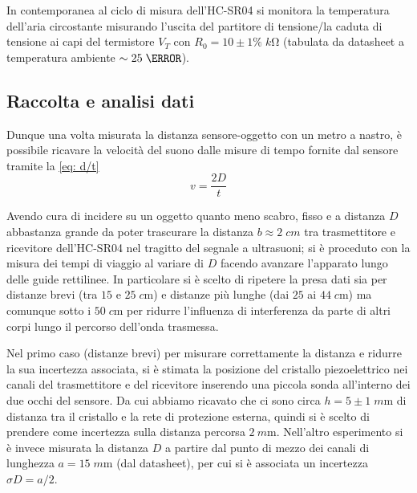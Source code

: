 \documentclass[10pt, a4paper, italian]{article}
\begin{document}
In contemporanea al ciclo di misura dell'HC-SR04 si monitora la temperatura
dell'aria circostante misurando l'uscita del partitore di tensione/la caduta
di tensione ai capi del termistore $V_T$ con $R_0 = 10 \pm 1 \percent \;
\si{k\ohm}$ (tabulata da datasheet a temperatura ambiente $\sim 25 \;
\degreeCelsius$).

\subsection{Raccolta e analisi dati}\label{sbs: data}
Dunque una volta misurata la distanza sensore-oggetto con un metro a nastro,
è possibile ricavare la velocità del suono dalle misure di tempo fornite dal
sensore tramite la \cref{eq: d/t}
\begin{equation}\label{eq: d/t}
v = \frac{2 D}{t}
\end{equation}

Avendo cura di incidere su un oggetto quanto meno scabro, fisso e a distanza
$D$ abbastanza grande da poter trascurare la distanza $b \approx 2 \; \si{cm}$
tra trasmettitore e ricevitore dell'HC-SR04 nel tragitto del segnale a
ultrasuoni; si è proceduto con la misura dei tempi di viaggio al variare di
$D$ facendo avanzare l'apparato lungo delle guide rettilinee. In particolare
si è scelto di ripetere la presa dati sia per distanze brevi (tra $15$ e
$25 \; \si{c\m}$) e distanze più lunghe (dai $25$ ai $44 \; \si{c\m}$) ma
comunque sotto i $50 \; \si{c\m}$ per ridurre l'influenza di interferenza da
parte di altri corpi lungo il percorso dell'onda trasmessa.

Nel primo caso (distanze brevi) per misurare correttamente la distanza e
ridurre la sua incertezza associata, si è stimata la posizione del cristallo
piezoelettrico nei canali del trasmettitore e del ricevitore inserendo una
piccola sonda all'interno dei due occhi del sensore. Da cui abbiamo ricavato
che ci sono circa $h = 5 \pm 1 \; \si{m\m}$ di distanza tra il cristallo e la
rete di protezione esterna, quindi si è scelto di prendere come incertezza
sulla distanza percorsa $\SI{2}{m\m}$. Nell'altro esperimento si è invece
misurata la distanza $D$ a partire dal punto di mezzo dei canali di lunghezza
$a = 15 \; \si{m\m}$ (dal datasheet), per cui si è associata un incertezza
$\sigma D = a/2$.
\end{document}
